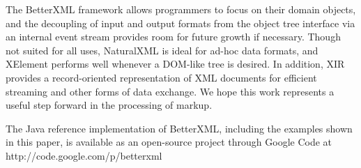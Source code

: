 The BetterXML framework allows programmers to focus on their domain
objects, and the decoupling of input and output formats from the
object tree interface via an internal event stream provides room for
future growth if necessary.  Though not suited for all uses,
NaturalXML is ideal for ad-hoc data formats, and XElement performs
well whenever a DOM-like tree is desired.  In addition, XIR provides a
record-oriented representation of XML documents for efficient
streaming and other forms of data exchange. We hope this work
represents a useful step forward in the processing of markup.

The Java reference implementation of BetterXML, including the examples
shown in this paper, is available as an open-source project through
Google Code at http://code.google.com/p/betterxml